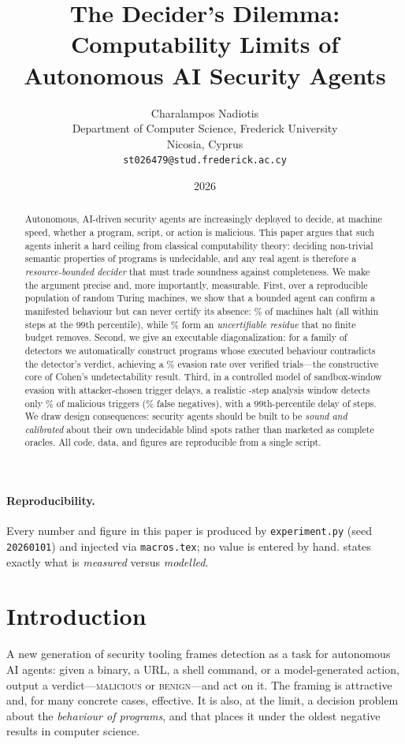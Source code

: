 \documentclass[11pt]{article}
\title{\textbf{The Decider's Dilemma:\\ Computability Limits of Autonomous AI Security Agents}}
\author{Charalampos Nadiotis\\
  \small Department of Computer Science, Frederick University\\
  \small Nicosia, Cyprus\\
  \small \texttt{st026479@stud.frederick.ac.cy}}
\date{2026}
\theoremstyle{plain}
\theoremstyle{definition}
\begin{document}
\maketitle

\begin{abstract}
\noindent
Autonomous, AI-driven security agents are increasingly deployed to decide, at
machine speed, whether a program, script, or action is malicious. This paper
argues that such agents inherit a hard ceiling from classical computability
theory: deciding non-trivial semantic properties of programs is undecidable,
and any real agent is therefore a \emph{resource-bounded decider} that must
trade soundness against completeness. We make the argument precise and, more
importantly, measurable. First, over a reproducible population of
\expN{} random Turing machines, we show that a bounded agent can confirm a
manifested behaviour but can never certify its absence: \expHaltPct\% of
machines halt (all within \expHaltPtail{} steps at the $99$th percentile), while
\expNonhaltPct\% form an \emph{uncertifiable residue} that no finite budget
removes. Second, we give an executable diagonalization: for a family of
\expDetN{} detectors we automatically construct programs whose executed
behaviour contradicts the detector's verdict, achieving a \expEvRate\% evasion
rate over \expEvTrials{} verified trials---the constructive core of Cohen's
undetectability result. Third, in a controlled model of sandbox-window
evasion with attacker-chosen trigger delays, a realistic \expSbWindow-step
analysis window detects only \expSbRecall\% of malicious triggers
(\expSbFnr\% false negatives), with a $99$th-percentile delay of
\expSbDelayTail{} steps. We draw design consequences: security agents should be
built to be \emph{sound and calibrated} about their own undecidable blind
spots rather than marketed as complete oracles. All code, data, and figures
are reproducible from a single script.
\end{abstract}

\paragraph{Reproducibility.}
Every number and figure in this paper is produced by \texttt{experiment.py}
(seed \texttt{20260101}) and injected via \texttt{macros.tex}; no value is
entered by hand.  states exactly what is \emph{measured}
versus \emph{modelled}.

\section{Introduction}
\label{sec:intro}
A new generation of security tooling frames detection as a task for autonomous
AI agents: given a binary, a URL, a shell command, or a model-generated action,
output a verdict---\textsc{malicious} or \textsc{benign}---and act on it. The
framing is attractive and, for many concrete cases, effective. It is also, at
the limit, a decision problem about the \emph{behaviour of programs}, and that
places it under the oldest negative results in computer science.
\end{document}
